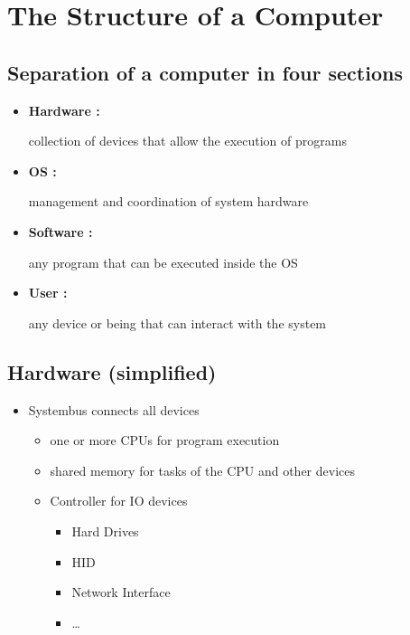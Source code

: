 \hypertarget{the-structure-of-a-computer}{%
\section{The Structure of a
Computer}\label{the-structure-of-a-computer}}

\hypertarget{separation-of-a-computer-in-four-sections}{%
\subsection{Separation of a computer in four
sections}\label{separation-of-a-computer-in-four-sections}}

\begin{itemize}
\item
  \textbf{Hardware :}

  collection of devices that allow the execution of programs
\item
  \textbf{OS :}

  management and coordination of system hardware
\item
  \textbf{Software :}

  any program that can be executed inside the OS
\item
  \textbf{User :}

  any device or being that can interact with the system
\end{itemize}

\hypertarget{hardware-simplified}{%
\subsection{Hardware (simplified)}\label{hardware-simplified}}

\begin{itemize}
\tightlist
\item
  Systembus connects all devices

  \begin{itemize}
  \tightlist
  \item
    one or more CPUs for program execution
  \item
    shared memory for tasks of the CPU and other devices
  \item
    Controller for IO devices

    \begin{itemize}
    \tightlist
    \item
      Hard Drives
    \item
      HID
    \item
      Network Interface
    \item
      \ldots{}
    \end{itemize}
  \end{itemize}
\end{itemize}

